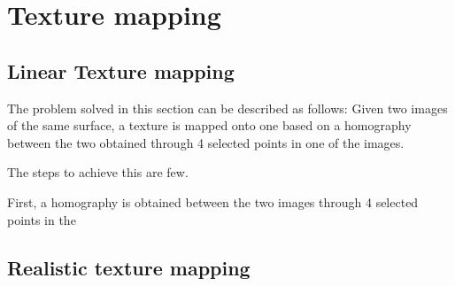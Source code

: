 \section{Texture mapping}

\subsection{Linear Texture mapping}
The problem solved in this section can be described as follows:
\newline
Given two images of the same surface, a texture is mapped onto one based on a homography between the two obtained through 4 selected points in one of the images. 

The steps to achieve this are few. 

First, a homography is obtained between the two images through 4 selected
points in the 



\subsection{Realistic texture mapping}
